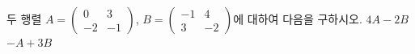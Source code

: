 \hspace*{2mm}\begin{minipage}[t]{\dimexpr\linewidth-2mm\relax}\vspace{0pt}
두 행렬 $A=\begin{pmatrix} 0 & 3 \\ -2 & -1 \end{pmatrix}$, $B=\begin{pmatrix} -1 & 4 \\ 3 & -2 \end{pmatrix}$에 대하여 다음을 구하시오.
 $4A-2B$
 $-A+3B$\end{minipage}

